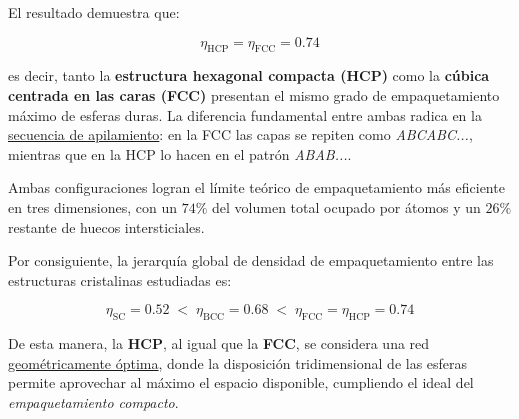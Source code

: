 \documentclass{article}
\begin{document}
\vspace{0.3cm}

El resultado demuestra que:

\[
\boxed{\eta_{\text{HCP}} = \eta_{\text{FCC}} = 0.74}
\]

es decir, tanto la \textbf{estructura hexagonal compacta (HCP)} como la \textbf{cúbica centrada en las caras (FCC)} presentan el mismo grado de empaquetamiento máximo de esferas duras.  
La diferencia fundamental entre ambas radica en la \underline{secuencia de apilamiento}:  
en la FCC las capas se repiten como \emph{ABCABC...}, mientras que en la HCP lo hacen en el patrón \emph{ABAB...}.  

Ambas configuraciones logran el límite teórico de empaquetamiento más eficiente en tres dimensiones, con un \(74\%\) del volumen total ocupado por átomos y un \(26\%\) restante de huecos intersticiales.

Por consiguiente, la jerarquía global de densidad de empaquetamiento entre las estructuras cristalinas estudiadas es:

\[
\eta_{\text{SC}} = 0.52 \;<\;
\eta_{\text{BCC}} = 0.68 \;<\;
\eta_{\text{FCC}} = \eta_{\text{HCP}} = 0.74
\]

\noindent
De esta manera, la \textbf{HCP}, al igual que la \textbf{FCC}, se considera una red \underline{geométricamente óptima}, donde la disposición tridimensional de las esferas permite aprovechar al máximo el espacio disponible, cumpliendo el ideal del \emph{empaquetamiento compacto}.

	
\end{document}
